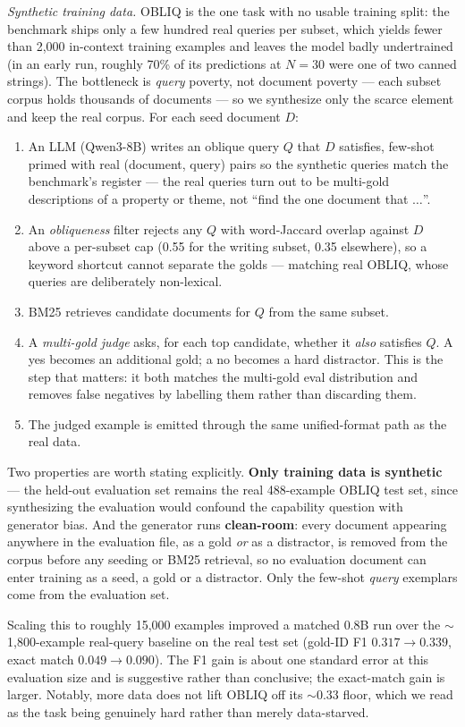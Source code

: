 \begin{claudeblock}
\emph{Synthetic training data.} OBLIQ is the one task with no usable training split: the benchmark
ships only a few hundred real queries per subset, which yields fewer than 2{,}000 in-context
training examples and leaves the model badly undertrained (in an early run, roughly 70\% of its
predictions at $N{=}30$ were one of two canned strings). The bottleneck is \emph{query} poverty, not
document poverty --- each subset corpus holds thousands of documents --- so we synthesize only the
scarce element and keep the real corpus. For each seed document $D$:

\begin{enumerate}
\item An LLM (Qwen3-8B) writes an oblique query $Q$ that $D$ satisfies, few-shot primed with real
(document, query) pairs so the synthetic queries match the benchmark's register --- the real queries
turn out to be multi-gold descriptions of a property or theme, not ``find the one document that
$\dots$''.
\item An \emph{obliqueness} filter rejects any $Q$ with word-Jaccard overlap against $D$ above a
per-subset cap (0.55 for the writing subset, 0.35 elsewhere), so a keyword shortcut cannot separate
the golds --- matching real OBLIQ, whose queries are deliberately non-lexical.
\item BM25 retrieves candidate documents for $Q$ from the same subset.
\item A \emph{multi-gold judge} asks, for each top candidate, whether it \emph{also} satisfies $Q$.
A yes becomes an additional gold; a no becomes a hard distractor. This is the step that matters: it
both matches the multi-gold eval distribution and removes false negatives by labelling them rather
than discarding them.
\item The judged example is emitted through the same unified-format path as the real data.
\end{enumerate}

Two properties are worth stating explicitly. \textbf{Only training data is synthetic} --- the
held-out evaluation set remains the real 488-example OBLIQ test set, since synthesizing the
evaluation would confound the capability question with generator bias. And the generator runs
\textbf{clean-room}: every document appearing anywhere in the evaluation file, as a gold
\emph{or} as a distractor, is removed from the corpus before any seeding or BM25 retrieval, so no
evaluation document can enter training as a seed, a gold or a distractor. Only the few-shot
\emph{query} exemplars come from the evaluation set.

Scaling this to roughly 15{,}000 examples improved a matched 0.8B run over the $\sim$1{,}800-example
real-query baseline on the real test set (gold-ID F1 $0.317 \to 0.339$, exact match $0.049 \to
0.090$). The F1 gain is about one standard error at this evaluation size and is suggestive rather
than conclusive; the exact-match gain is larger. Notably, more data does not lift OBLIQ off its
$\sim$0.33 floor, which we read as the task being genuinely hard rather than merely
data-starved.
\end{claudeblock}

